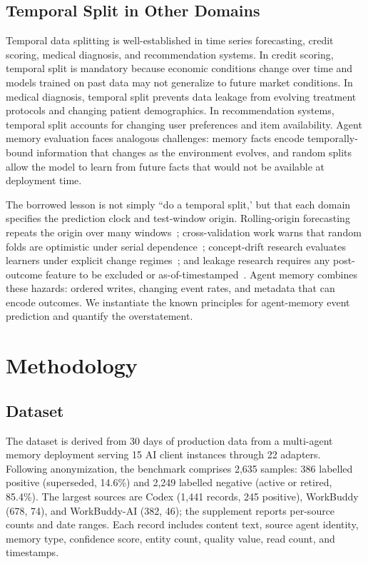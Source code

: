 \documentclass[sigconf,nonacm]{acmart}
\begin{document}
\subsection{Temporal Split in Other Domains}
Temporal data splitting is well-established in time series forecasting, credit scoring, medical diagnosis, and recommendation systems. In credit scoring, temporal split is mandatory because economic conditions change over time and models trained on past data may not generalize to future market conditions. In medical diagnosis, temporal split prevents data leakage from evolving treatment protocols and changing patient demographics. In recommendation systems, temporal split accounts for changing user preferences and item availability. Agent memory evaluation faces analogous challenges: memory facts encode temporally-bound information that changes as the environment evolves, and random splits allow the model to learn from future facts that would not be available at deployment time.

The borrowed lesson is not simply ``do a temporal split,' but that each domain specifies the prediction clock and test-window origin. Rolling-origin forecasting repeats the origin over many windows~\cite{tashman2000,bergmeir2012,cerqueira2020}; cross-validation work warns that random folds are optimistic under serial dependence~\cite{bergmeir2012}; concept-drift research evaluates learners under explicit change regimes~\cite{gama2014}; and leakage research requires any post-outcome feature to be excluded or as-of-timestamped~\cite{kaufman2012,kapoor2023}. Agent memory combines these hazards: ordered writes, changing event rates, and metadata that can encode outcomes. We instantiate the known principles for agent-memory event prediction and quantify the overstatement.
\section{Methodology}
\label{sec:methodology}

\subsection{Dataset}
The dataset is derived from 30 days of production data from a multi-agent memory deployment serving 15 AI client instances through 22 adapters. Following anonymization, the benchmark comprises 2,635 samples: 386 labelled positive (superseded, 14.6\%) and 2,249 labelled negative (active or retired, 85.4\%). The largest sources are Codex (1,441 records, 245 positive), WorkBuddy (678, 74), and WorkBuddy-AI (382, 46); the supplement reports per-source counts and date ranges. Each record includes content text, source agent identity, memory type, confidence score, entity count, quality value, read count, and timestamps.
\end{document}
